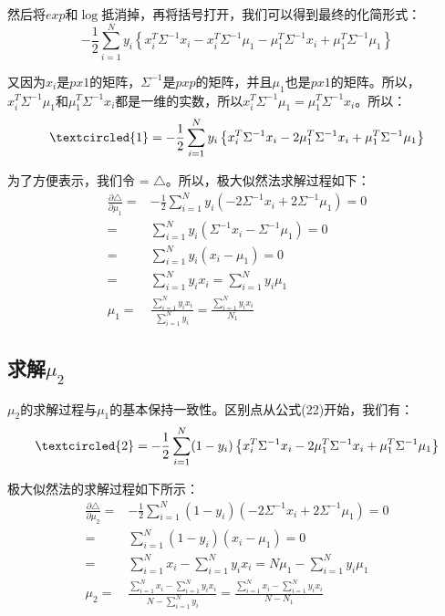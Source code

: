 \documentclass[a4paper]{article}
\begin{document}
然后将$exp$和$\log$抵消掉，再将括号打开，我们可以得到最终的化简形式：
\begin{equation}
    -\frac{1}{2}\sum_{i=1}^Ny_i\left\{ x_i^T\Sigma^{-1}x_i - x_i^T\Sigma^{-1}\mu_1 - \mu_1^T\Sigma^{-1}x_i + \mu_1^T\Sigma^{-1}\mu_1\right\}
\end{equation}

又因为$x_i$是$px1$的矩阵，$\Sigma^{-1}$是$pxp$的矩阵，并且$\mu_1$也是$px1$的矩阵。所以，$x_i^T\Sigma^{-1}\mu_1$和$\mu_1^T\Sigma^{-1}x_i$都是一维的实数，所以$x_i^T\Sigma^{-1}\mu_1=\mu_1^T\Sigma^{-1}x_i$。所以：
\begin{equation}
    \textcircled{1} = -\frac{1}{2}\sum_{i=1}^Ny_i\left\{ x_i^T\Sigma^{-1}x_i - 2\mu_1^T\Sigma^{-1}x_i + \mu_1^T\Sigma^{-1}\mu_1\right\}
\end{equation}

为了方便表示，我们令 = $\triangle$。所以，极大似然法求解过程如下：
\begin{equation}
    \begin{split}
        \frac{\partial \triangle}{\partial \mu_1} = & -\frac{1}{2}\sum_{i=1}^N y_i(- 2\Sigma^{-1}x_i + 2\Sigma^{-1}\mu_1) = 0 \\
        = & \sum_{i=1}^N y_i( \Sigma^{-1}x_i - \Sigma^{-1}\mu_1) = 0 \\
        = & \sum_{i=1}^N y_i( x_i - \mu_1) = 0 \\
        = & \sum_{i=1}^N y_i x_i = \sum_{i=1}^N y_i \mu_1  \\
        \mu_1 = & \frac{\sum_{i=1}^N y_i x_i}{\sum_{i=1}^N y_i} = \frac{\sum_{i=1}^N y_i x_i}{N_1}
    \end{split}
\end{equation}

\subsection{求解$\mu_2$}
$\mu_2$的求解过程与$\mu_1$的基本保持一致性。区别点从公式(22)开始，我们有：
\begin{equation}
    \textcircled{2}= -\frac{1}{2}\sum_{i=1}^N(1-y_i)\left\{ x_i^T\Sigma^{-1}x_i - 2\mu_1^T\Sigma^{-1}x_i + \mu_1^T\Sigma^{-1}\mu_1\right\}
\end{equation}

极大似然法的求解过程如下所示：
\begin{equation}
    \begin{split}
        \frac{\partial \triangle}{\partial \mu_2} = & -\frac{1}{2}\sum_{i=1}^N (1-y_i)(- 2\Sigma^{-1}x_i + 2\Sigma^{-1}\mu_1) = 0 \\
        = & \sum_{i=1}^N (1-y_i)( x_i - \mu_1) = 0 \\
        = & \sum_{i=1}^N x_i - \sum_{i=1}^N y_ix_i  =  N\mu_1  - \sum_{i=1}^N y_i\mu_1\\
        \mu_2 = & \frac{\sum_{i=1}^N x_i - \sum_{i=1}^N y_ix_i}{N - \sum_{i=1}^N y_i} = \frac{\sum_{i=1}^N x_i - \sum_{i=1}^N y_ix_i}{N - N_1}
    \end{split}
\end{equation}
\end{document}
